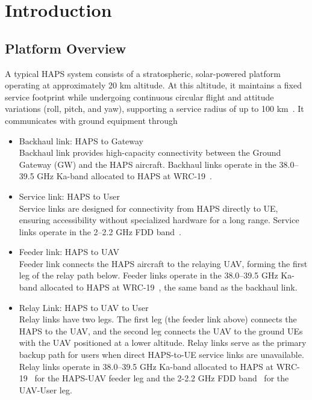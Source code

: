 \documentclass[conference]{IEEEtran}
\begin{document}
\section{Introduction}

\subsection{Platform Overview}

A typical HAPS system consists of a stratospheric, solar-powered platform operating at approximately 20 km altitude. At this altitude, it maintains a fixed service footprint while undergoing continuous circular flight and attitude variations (roll, pitch, and yaw), supporting a service radius of up to 100 km~\cite{itu_m2101,itu_m2106}. It communicates with ground equipment through

\begin{itemize}
  \item {Backhaul link: HAPS to Gateway} \\
    Backhaul link provides high-capacity connectivity between the Ground Gateway (GW) and the HAPS aircraft. Backhaul links operate in the 38.0--39.5 GHz Ka-band allocated to HAPS at WRC-19~\cite{wrc19}.

  \item { Service link:  HAPS to User} \\
 Service links are designed for connectivity from HAPS directly to  UE, ensuring accessibility without specialized hardware for a long range. Service links operate in the 2--2.2 GHz FDD band~\cite{3gpp_ts38101_5}.

  \item {Feeder link: HAPS to UAV} \\
    Feeder link connects the HAPS aircraft to the relaying UAV, forming the first leg of the relay path below. Feeder links operate in the 38.0--39.5 GHz Ka-band allocated to HAPS at WRC-19~\cite{wrc19}, the same band as the backhaul link.

  \item {Relay Link: HAPS to UAV to User} \\
  Relay links have two legs. The first leg (the feeder link above) connects the HAPS to the UAV, and the second leg connects the UAV to the ground UEs with the UAV positioned at a lower altitude. Relay links serve as the primary backup path for users when direct HAPS-to-UE service links are unavailable. Relay links operate in 38.0--39.5 GHz Ka-band allocated to HAPS at WRC-19~\cite{wrc19} for the HAPS-UAV feeder leg and the 2-2.2 GHz FDD band~\cite{3gpp_ts38101_5} for the UAV-User leg.

\end{itemize}
\end{document}
